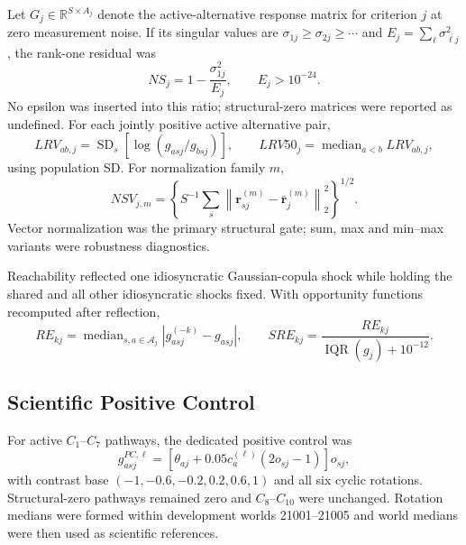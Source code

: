 \documentclass[runningheads,orivec]{llncs}
\newcommand{\median}{\operatorname{median}}
\newcommand{\IQR}{\operatorname{IQR}}
\newcommand{\SD}{\operatorname{SD}}
\begin{document}
Let $G_j\in\mathbb R^{S\times A_j}$ denote the active-alternative response matrix for criterion
$j$ at zero measurement noise. If its singular values are
$\sigma_{1j}\ge\sigma_{2j}\ge\cdots$ and
$E_j=\sum_\ell\sigma_{\ell j}^2$, the rank-one residual was
\begin{equation}
NS_j=1-\frac{\sigma_{1j}^2}{E_j},
\qquad E_j>10^{-24}.
\label{supp:eq:NS}
\end{equation}
No epsilon was inserted into this ratio; structural-zero matrices were reported as undefined.
For each jointly positive active alternative pair,
\begin{equation}
LRV_{ab,j}=\SD_s\!\left[\log(g_{asj}/g_{bsj})\right],
\qquad
LRV50_j=\median_{a<b}LRV_{ab,j},
\label{supp:eq:LRV}
\end{equation}
using population SD. For normalization family $m$,
\begin{equation}
NSV_{j,m}=\left\{S^{-1}\sum_s
\left\|\mathbf r_{sj}^{(m)}-\bar{\mathbf r}_j^{(m)}\right\|_2^2\right\}^{1/2}.
\label{supp:eq:NSV}
\end{equation}
Vector normalization was the primary structural gate; sum, max and min--max variants were
robustness diagnostics.

Reachability reflected one idiosyncratic Gaussian-copula shock while holding the shared and all
other idiosyncratic shocks fixed. With opportunity functions recomputed after reflection,
\begin{equation}
RE_{kj}=\median_{s,a\in\mathcal A_j}|g_{asj}^{(-k)}-g_{asj}|,
\qquad
SRE_{kj}=\frac{RE_{kj}}{\IQR(g_j)+10^{-12}}.
\label{supp:eq:SRE}
\end{equation}

\subsection{Scientific Positive Control}

For active $C_1$--$C_7$ pathways, the dedicated positive control was
\begin{equation}
g_{asj}^{PC,\ell}=\left[\theta_{aj}+0.05c_a^{(\ell)}(2o_{sj}-1)\right]o_{sj},
\label{supp:eq:positivecontrol}
\end{equation}
with contrast base $(-1,-0.6,-0.2,0.2,0.6,1)$ and all six cyclic rotations. Structural-zero
pathways remained zero and $C_8$--$C_{10}$ were unchanged. Rotation medians were formed within
development worlds 21001--21005 and world medians were then used as scientific references.
\end{document}
